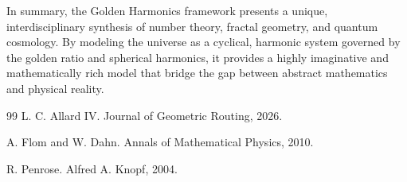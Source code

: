 \documentclass[11pt,twoside,a4paper]{article}
\begin{document}
In summary, the Golden Harmonics framework presents a unique, interdisciplinary synthesis of number theory, fractal geometry, and quantum cosmology. By modeling the universe as a cyclical, harmonic system governed by the golden ratio and spherical harmonics, it provides a highly imaginative and mathematically rich model that bridge the gap between abstract mathematics and physical reality.

\begin{thebibliography}{99}
L. C. Allard IV.
\newblock Journal of Geometric Routing, 2026.

A. Flom and W. Dahn.
\newblock Annals of Mathematical Physics, 2010.

R. Penrose.
\newblock Alfred A. Knopf, 2004.
\end{thebibliography}
\end{document}
